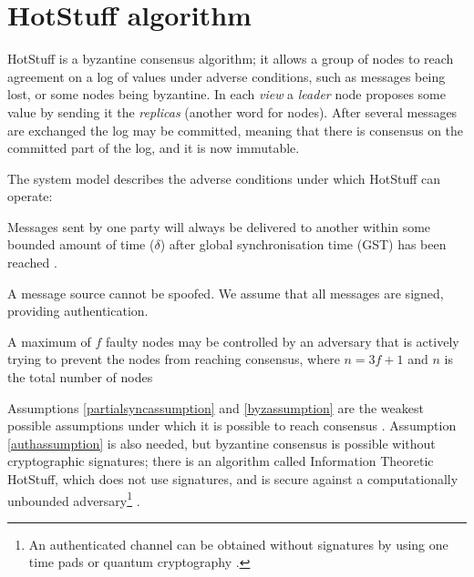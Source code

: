 \section{HotStuff algorithm} \label{hotstufftheory}
HotStuff is a byzantine consensus algorithm; it allows a group of nodes to reach agreement on a log of values under adverse conditions, such as messages being lost, or some nodes being byzantine. In each \textit{view} a \textit{leader} node proposes some value by sending it the \textit{replicas} (another word for nodes). After several messages are exchanged the log may be committed, meaning that there is consensus on the committed part of the log, and it is now immutable.

The system model describes the adverse conditions under which HotStuff can operate:
\begin{assumption} \label{partialsyncassumption}
	Messages sent by one party will always be delivered to another within some bounded amount of time ($\delta$) after global synchronisation time (GST) has been reached \cite{dworkConsensusPresencePartial1988}.
\end{assumption}

\begin{assumption}[Authenticated] \label{authassumption}
	A message source cannot be spoofed. We assume that all messages are signed, providing authentication.
\end{assumption}

\begin{assumption}[Byzantine] \label{byzassumption}
	A maximum of $f$ faulty nodes may be controlled by an adversary that is actively trying to prevent the nodes from reaching consensus, where $n = 3f + 1$ and $n$ is the total number of nodes
\end{assumption}

Assumptions \ref{partialsyncassumption} and \ref{byzassumption} are the weakest possible assumptions under which it is possible to reach consensus \cite{peaseReachingAgreementPresence1980,fischerEasyImpossibilityProofs1986}. Assumption \ref{authassumption} is also needed, but byzantine consensus is possible without cryptographic signatures; there is an algorithm called Information Theoretic HotStuff, which does not use signatures, and is secure against a computationally unbounded adversary\footnote{An authenticated channel can be obtained without signatures by using one time pads or quantum cryptography \cite{bennettExperimentalQuantumCryptography1992}.} \cite{abrahamInformationTheoreticHotStuff2020}.

